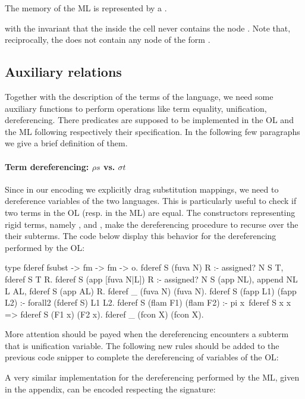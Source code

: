 \documentclass[sigconf,natbib=false]{acmart}
\begin{document}
The memory of the ML is represented by a .

\noindent
with the invariant that the  inside the cell never contains the node
. Note that, reciprocally, the  does not contain
any node of the form .

\subsection{Auxiliary relations}

Together with the description of the terms of the language, we need some
auxiliary functions to perform operations like term equality, unification,
dereferencing. There predicates are supposed to be implemented in the OL and the
ML following respectively their specification. In the following few paragraphs
we give a brief definition of them.

\paragraph{Term dereferencing: $\rho s$ vs. $\sigma t$}

Since in our encoding we explicitly drag substitution mappings, we need to
dereference variables of the two languages. This is particularly useful to check
if two terms in the OL (resp. in the ML) are equal. The constructors
representing rigid terms, namely ,  and ,
make the dereferencing procedure to recurse over the their subterms. The code
below display this behavior for the dereferencing performed by the OL:

\begin{elpicodetab}
  type fderef fsubst -> fm -> fm -> o.
  fderef S (fuva N) R :- assigned? N S T, fderef S T R.
  fderef S (app [fuva N|L]) R :- 
    assigned? N S (app NL), append NL L AL, fderef S (app AL) R.
  fderef _ (fuva N) (fuva N).
  fderef S (fapp L1) (fapp L2) :- forall2 (fderef S) L1 L2.
  fderef S (flam F1) (flam F2) :- 
    pi x\ fderef S x x => fderef S (F1 x) (F2 x).
  fderef _ (fcon X) (fcon X).
\end{elpicodetab}

More attention should be payed when the dereferencing encounters a subterm that
is unification variable. The following new rules should be added to the previous
code snipper to complete the dereferencing of variables of the OL:

A very similar implementation for the dereferencing performed by the ML, given 
in the appendix, can be encoded respecting the signature:
\end{document}
